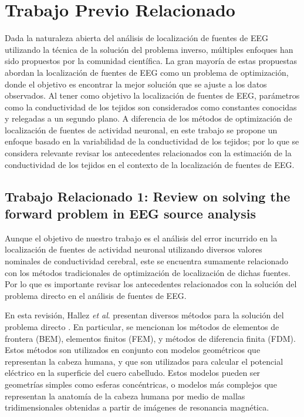 %
\chapter{Trabajo Previo Relacionado}
\label{sec:related}

 Dada la naturaleza abierta del análisis de localización de fuentes de EEG utilizando la técnica de la solución del problema inverso, múltiples enfoques han sido propuestos por la comunidad científica. La gran mayoría de estas propuestas abordan la localización de fuentes de EEG como un problema de optimización, donde el objetivo es encontrar la mejor solución que se ajuste a los datos observados. Al tener como objetivo la localización de fuentes de EEG, parámetros como la conductividad de los tejidos son considerados como constantes conocidas y relegadas a un segundo plano. A diferencia de los métodos de optimización de localización de fuentes de actividad neuronal, en este trabajo se propone un enfoque basado en la variabilidad de la conductividad de los tejidos; por lo que se considera relevante revisar los antecedentes relacionados con la estimación de la conductividad de los tejidos en el contexto de la localización de fuentes de EEG. 

\section{Trabajo Relacionado 1: Review on solving the forward problem in EEG source analysis}
\label{sec:related:hallez}

Aunque el objetivo de nuestro trabajo es el análisis del error incurrido en la localización de fuentes de actividad neuronal utilizando diversos valores nominales de conductividad cerebral, este se encuentra sumamente relacionado con los métodos tradicionales de optimización de localización de dichas fuentes. Por lo que es importante revisar los antecedentes relacionados con la solución del problema directo en el análisis de fuentes de EEG.

En esta revisión, Hallez \emph{et al}. presentan diversos métodos para la solución del problema directo \cite{Hallez2007}. En particular, se mencionan los métodos de elementos de frontera (BEM), elementos finitos (FEM), y métodos de diferencia finita (FDM). Estos métodos son utilizados en conjunto con modelos geométricos que representan la cabeza humana, y que son utilizados para calcular el potencial eléctrico en la superficie del cuero cabelludo. Estos modelos pueden ser geometrías simples como esferas concéntricas, o modelos más complejos que representan la anatomía de la cabeza humana por medio de mallas tridimensionales obtenidas a partir de imágenes de resonancia magnética.

